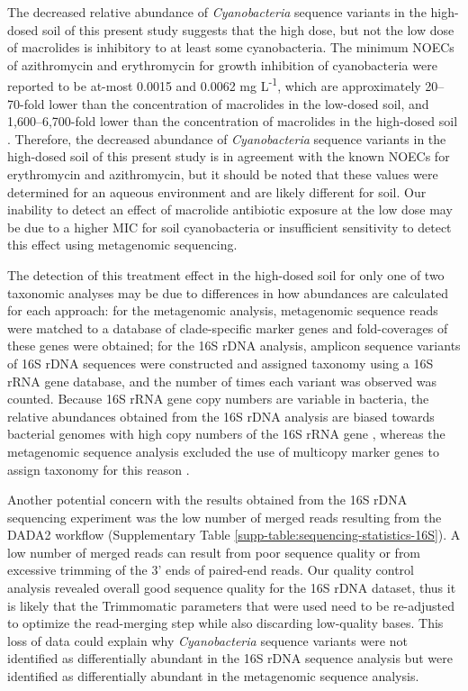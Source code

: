 The decreased relative abundance of \textit{Cyanobacteria} sequence variants in the high-dosed soil of this present study suggests that the high dose, but not the low dose of macrolides is inhibitory to at least some cyanobacteria.
The minimum NOECs of azithromycin and erythromycin for growth inhibition of cyanobacteria were reported to be at-most 0.0015 and 0.0062 mg L\textsuperscript{-1}, which are approximately 20--70-fold lower than the concentration of macrolides in the low-dosed soil, and 1,600--6,700-fold lower than the concentration of macrolides in the high-dosed soil \parencite{LePage.2019}.
Therefore, the decreased abundance of \textit{Cyanobacteria} sequence variants in the high-dosed soil of this present study is in agreement with the known NOECs for erythromycin and azithromycin, but it should be noted that these values were determined for an aqueous environment and are likely different for soil.
Our inability to detect an effect of macrolide antibiotic exposure at the low dose may be due to a higher MIC for soil cyanobacteria or insufficient sensitivity to detect this effect using metagenomic sequencing.

The detection of this treatment effect in the high-dosed soil for only one of two taxonomic analyses may be due to differences in how abundances are calculated for each approach:
for the metagenomic analysis, metagenomic sequence reads were matched to a database of clade-specific marker genes and fold-coverages of these genes were obtained;
for the 16S rDNA analysis, amplicon sequence variants of 16S rDNA sequences were constructed and assigned taxonomy using a 16S rRNA gene database, and the number of times each variant was observed was counted.
Because 16S rRNA gene copy numbers are variable in bacteria, the relative abundances obtained from the 16S rDNA analysis are biased towards bacterial genomes with high copy numbers of the 16S rRNA gene \parencite{Kembel.2012}, whereas the metagenomic sequence analysis excluded the use of multicopy marker genes to assign taxonomy for this reason \parencite{Segata.2012}.

Another potential concern with the results obtained from the 16S rDNA sequencing experiment was the low number of merged reads resulting from the DADA2 workflow (Supplementary Table \ref{supp-table:sequencing-statistics-16S}).
A low number of merged reads can result from poor sequence quality or from excessive trimming of the 3’ ends of paired-end reads.
Our quality control analysis revealed overall good sequence quality for the 16S rDNA dataset, thus it is likely that the Trimmomatic parameters that were used need to be re-adjusted to optimize the read-merging step while also discarding low-quality bases.
This loss of data could explain why \textit{Cyanobacteria} sequence variants were not identified as differentially abundant in the 16S rDNA sequence analysis but were identified as differentially abundant in the metagenomic sequence analysis.

